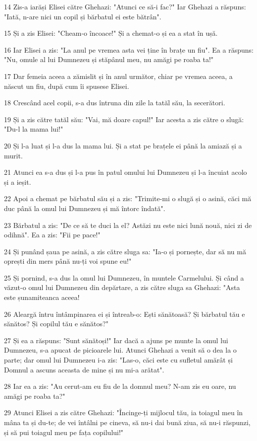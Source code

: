 \par 14 Zis-a iarăși Elisei către Ghehazi: "Atunci ce să-i fac?" Iar Ghehazi a răspuns: "Iată, n-are nici un copil și bărbatul ei este bătrân".
\par 15 Și a zis Elisei: "Cheam-o încoace!" Și a chemat-o și ea a stat în ușă.
\par 16 Iar Elisei a zis: "La anul pe vremea asta vei ține în brațe un fiu". Ea a răspuns: "Nu, omule al lui Dumnezeu și stăpânul meu, nu amăgi pe roaba ta!"
\par 17 Dar femeia aceea a zămislit și în anul următor, chiar pe vremea aceea, a născut un fiu, după cum îi spusese Elisei.
\par 18 Crescând acel copii, s-a dus întruna din zile la tatăl său, la secerători.
\par 19 Și a zis către tatăl său: "Vai, mă doare capul!" Iar acesta a zis către o slugă: "Du-l la mama lui!"
\par 20 Și l-a luat și l-a dus la mama lui. Și a stat pe brațele ei până la amiază și a murit.
\par 21 Atunci ea s-a dus și l-a pus în patul omului lui Dumnezeu și l-a încuiat acolo și a ieșit.
\par 22 Apoi a chemat pe bărbatul său și a zis: "Trimite-mi o slugă și o asină, căci mă duc până la omul lui Dumnezeu și mă întorc îndată".
\par 23 Bărbatul a zis: "De ce să te duci la el? Astăzi nu este nici lună nouă, nici zi de odihnă". Ea a zis: "Fii pe pace!"
\par 24 Și punând șaua pe asină, a zis către sluga sa: "Ia-o și pornește, dar să nu mă oprești din mers până nu-ți voi spune eu!"
\par 25 Și pornind, s-a dus la omul lui Dumnezeu, în muntele Carmelului. Și când a văzut-o omul lui Dumnezeu din depărtare, a zis către sluga sa Ghehazi: "Asta este șunamiteanca aceea!
\par 26 Aleargă întru întâmpinarea ei și întreab-o: Ești sănătoasă? Și bărbatul tău e sănătos? Și copilul tău e sănătos?"
\par 27 Și ea a răspuns: "Sunt sănătoși!" Iar dacă a ajuns pe munte la omul lui Dumnezeu, s-a apucat de picioarele lui. Atunci Ghehazi a venit să o dea la o parte; dar omul lui Dumnezeu i-a zis: "Las-o, căci este cu sufletul amărât și Domnul a ascuns aceasta de mine și nu mi-a arătat".
\par 28 Iar ea a zis: "Au cerut-am eu fiu de la domnul meu? N-am zis eu oare, nu amăgi pe roaba ta?"
\par 29 Atunci Elisei a zis către Ghehazi: "Încinge-ți mijlocul tău, ia toiagul meu în mâna ta și du-te; de vei întâlni pe cineva, să nu-i dai bună ziua, să nu-i răspunzi, și să pui toiagul meu pe fața copilului!"
